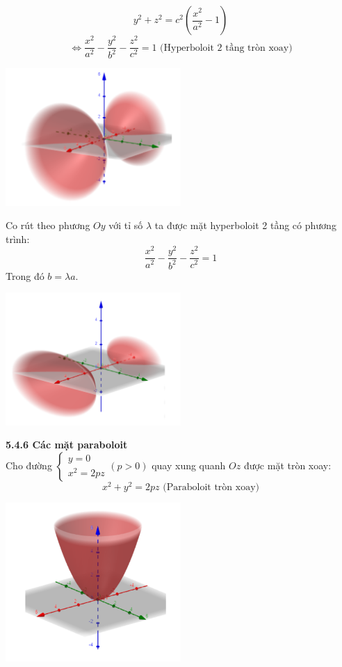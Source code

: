 \documentclass[12pt,a4]{article}
\begin{document}
\begin{titlepage}
\[
y^2 + z^2 = c^2(\frac{x^2}{a^2} - 1)
\]
\[
\Leftrightarrow \frac{x^2}{a^2} - \frac{y^2}{b^2} - \frac{z^2}{c^2} = 1 \text{ (Hyperboloit 2 tầng tròn xoay)}
\]
\begin{center}
    \includegraphics[width=0.5\textwidth]{image/hybepol3.png}
\end{center}
Co rút theo phương $Oy$ với tỉ số $\lambda$ ta được mặt hyperboloit 2 tầng có phương trình:
\[
    \frac{x^2}{a^2} - \frac{y^2}{b^2} - \frac{z^2}{c^2} = 1
\]
Trong đó $b = \lambda a.$\\
\begin{center}
    \includegraphics[width=0.5\textwidth]{image/hybepol4.png}
\end{center}
\vspace{0.2cm}
\textbf{5.4.6 Các mặt paraboloit}\\
\vspace{0.2cm}
Cho đường $\begin{cases}y = 0\\x^2 = 2pz \end{cases} (p > 0)$ quay xung quanh $Oz$ được mặt tròn xoay:
\[
x^2 + y^2 = 2pz \text{ (Paraboloit tròn xoay)}
\] 
\begin{center}
    \includegraphics[width=0.5\textwidth]{image/pa1.png}

\end{center}
\end{titlepage}
\end{document}
